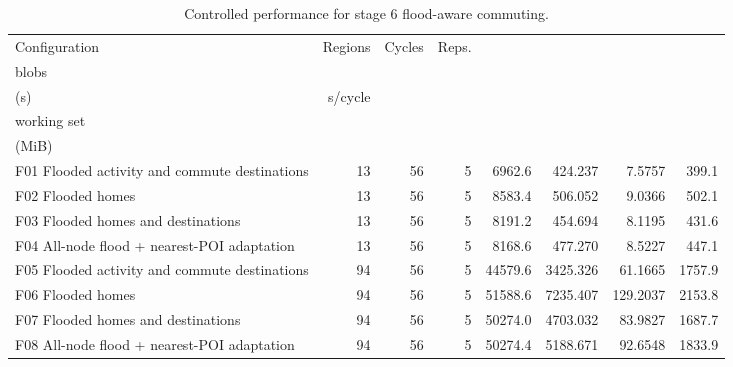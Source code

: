 \begin{table}[htbp]
\centering
\caption{Controlled performance for stage 6 flood-aware commuting.}
\label{tab:quantitative-performance-disruption}
\begin{tabularx}{\textwidth}{@{}>{\raggedright\arraybackslash}Xrrrrrrr@{}}
\toprule
Configuration & Regions & Cycles & Reps. & \begin{tabular}[c]{@{}c@{}}Mean max.\\blobs\end{tabular} & \begin{tabular}[c]{@{}c@{}}Mean runtime\\(s)\end{tabular} & s/cycle & \begin{tabular}[c]{@{}c@{}}Mean peak\\working set\\(MiB)\end{tabular} \\
\midrule
F01 Flooded activity and commute destinations & 13 & 56 & 5 & 6962.6 & 424.237 & 7.5757 & 399.1 \\
F02 Flooded homes & 13 & 56 & 5 & 8583.4 & 506.052 & 9.0366 & 502.1 \\
F03 Flooded homes and destinations & 13 & 56 & 5 & 8191.2 & 454.694 & 8.1195 & 431.6 \\
F04 All-node flood + nearest-POI adaptation & 13 & 56 & 5 & 8168.6 & 477.270 & 8.5227 & 447.1 \\
F05 Flooded activity and commute destinations & 94 & 56 & 5 & 44579.6 & 3425.326 & 61.1665 & 1757.9 \\
F06 Flooded homes & 94 & 56 & 5 & 51588.6 & 7235.407 & 129.2037 & 2153.8 \\
F07 Flooded homes and destinations & 94 & 56 & 5 & 50274.0 & 4703.032 & 83.9827 & 1687.7 \\
F08 All-node flood + nearest-POI adaptation & 94 & 56 & 5 & 50274.4 & 5188.671 & 92.6548 & 1833.9 \\
\bottomrule
\end{tabularx}
\end{table}

